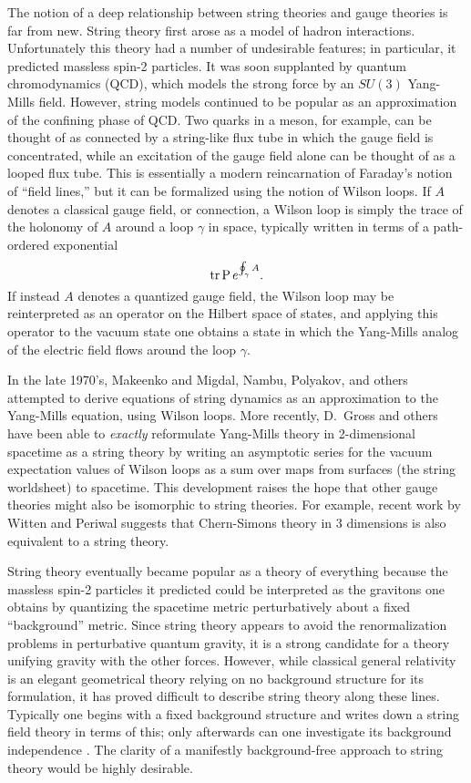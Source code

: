 \documentclass[12pt]{article}
\newcommand{\tr}{{\rm tr}}
\begin{document}
The notion of a deep relationship between string theories
and gauge theories is far from new.  String theory first arose
as a model of hadron interactions.
Unfortunately this theory had a number of undesirable
features; in particular, it predicted massless spin-2 particles.
It was soon supplanted by quantum chromodynamics (QCD), which models the
strong force by an $SU(3)$ Yang-Mills field.   However, string
models continued to be popular as an approximation of the confining phase
of QCD.  Two quarks in a meson, for
example, can be thought of as connected by a string-like flux tube in
which the gauge field is concentrated, while
an excitation of the gauge field alone can be thought of as a looped
flux tube.   This is essentially a modern reincarnation of
Faraday's notion of ``field lines,'' but it can be formalized using the
notion of Wilson loops.
If $A$ denotes a classical gauge field, or connection, a Wilson
loop is simply the trace of the holonomy of $A$ around a loop $\gamma$ in
space, typically written in terms of a path-ordered exponential
\[           \tr\, {\rm P}\, e^{ \oint_\gamma A }. \]
If instead $A$ denotes a quantized gauge field, the Wilson loop may be
reinterpreted as an operator on the Hilbert space of states, and
applying this operator to the vacuum state one obtains a state
in which the Yang-Mills analog of the electric field flows around
the loop $\gamma$.

In the late 1970's, Makeenko and Migdal, Nambu,
Polyakov, and others \cite{Nambu,Polyakov} attempted to derive
equations of string dynamics as an approximation to
the Yang-Mills equation, using Wilson loops.   More
recently, D.\ Gross and others
\cite{Gross,GT,Minahan,MP,NRS} have been able to {\it exactly} reformulate
Yang-Mills theory in 2-dimensional spacetime as a string theory
by writing an asymptotic series for the
vacuum expectation values of Wilson loops
as a sum over maps from surfaces (the string
worldsheet) to spacetime.   This development raises the hope that other
gauge theories might also be isomorphic to string theories.  For
example, recent work
by Witten \cite{Witten3} and Periwal \cite{Periwal} suggests that
Chern-Simons theory in 3 dimensions is also equivalent to a string
theory.

String theory eventually became popular as a theory of everything
because the massless spin-2 particles it predicted could be interpreted
as the gravitons one obtains by quantizing the spacetime
metric perturbatively about a fixed ``background'' metric.  Since
string theory appears to avoid the renormalization problems in
perturbative quantum gravity, it is a strong candidate for a theory
unifying gravity with the other forces.
However, while classical general relativity is an elegant
geometrical theory relying on no background structure for its formulation,
it has proved difficult to describe string theory along these lines.
Typically one begins with a fixed background structure and writes down
a string field theory in terms of this;
only afterwards can one investigate its background
independence \cite{Zwiebach}.
The clarity of a manifestly background-free approach
to string theory would be highly desirable.
\end{document}
